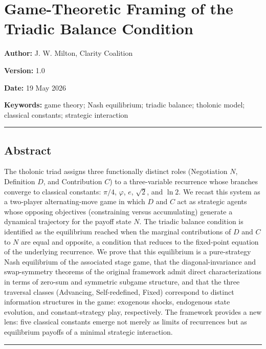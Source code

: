 \documentclass[
  11pt,
  letterpaper,
]{article}
\author{}
\date{}
\begin{document}
\section{Game-Theoretic Framing of the Triadic Balance
Condition}\label{game-theoretic-framing-of-the-triadic-balance-condition}

\textbf{Author:} J. W. Milton, Clarity Coalition

\textbf{Version:} 1.0

\textbf{Date:} 19 May 2026

\textbf{Keywords:} game theory; Nash equilibrium; triadic balance;
tholonic model; classical constants; strategic interaction

\begin{center}\rule{0.5\linewidth}{0.5pt}\end{center}

\subsection{Abstract}\label{abstract}

The tholonic triad assigns three functionally distinct roles
(Negotiation \(N\), Definition \(D\), and Contribution \(C\)) to a
three-variable recurrence whose branches converge to classical
constants: \(\pi/4\), \(\varphi\), \(e\), \(\sqrt{2}\), and \(\ln 2\).
We recast this system as a two-player alternating-move game in which
\(D\) and \(C\) act as strategic agents whose opposing objectives
(constraining versus accumulating) generate a dynamical trajectory for
the payoff state \(N\). The triadic balance condition is identified as
the equilibrium reached when the marginal contributions of \(D\) and
\(C\) to \(N\) are equal and opposite, a condition that reduces to the
fixed-point equation of the underlying recurrence. We prove that this
equilibrium is a pure-strategy Nash equilibrium of the associated stage
game, that the diagonal-invariance and swap-symmetry theorems of the
original framework admit direct characterizations in terms of zero-sum
and symmetric subgame structure, and that the three traversal classes
(Advancing, Self-redefined, Fixed) correspond to distinct information
structures in the game: exogenous shocks, endogenous state evolution,
and constant-strategy play, respectively. The framework provides a new
lens: five classical constants emerge not merely as limits of
recurrences but as equilibrium payoffs of a minimal strategic
interaction.

\begin{center}\rule{0.5\linewidth}{0.5pt}\end{center}
\end{document}
